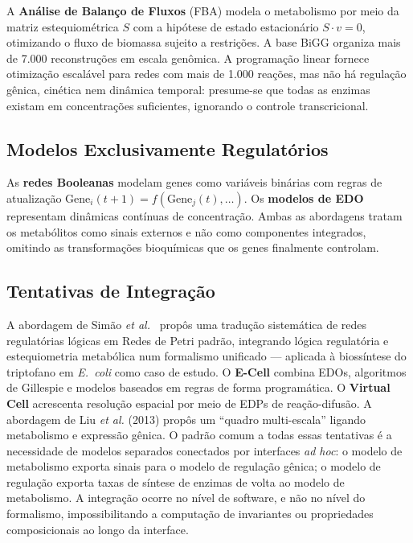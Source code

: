 A \textbf{Análise de Balanço de Fluxos} (FBA) modela o metabolismo por meio da
matriz estequiométrica $S$ com a hipótese de estado estacionário $S \cdot v = 0$,
otimizando o fluxo de biomassa sujeito a restrições. A base BiGG organiza mais
de 7.000 reconstruções em escala genômica. A programação linear fornece
otimização escalável para redes com mais de 1.000 reações, mas não há regulação
gênica, cinética nem dinâmica temporal: presume-se que todas as enzimas existam em
concentrações suficientes, ignorando o controle transcricional.

\subsection{Modelos Exclusivamente Regulatórios}
\label{subsec:apenas-reg}

As \textbf{redes Booleanas} modelam genes como variáveis binárias com regras de
atualização $\text{Gene}_i(t+1) = f(\text{Gene}_j(t), \ldots)$. Os \textbf{modelos de EDO} representam dinâmicas contínuas de concentração. Ambas as abordagens tratam os metabólitos como sinais externos e não como componentes integrados, omitindo as transformações bioquímicas que os genes finalmente controlam.

\subsection{Tentativas de Integração}
\label{subsec:tentativas-int}

A abordagem de Sim{\~a}o \emph{et al.}~\cite{Simao2005} propôs uma tradução
sistemática de redes regulatórias lógicas em Redes de Petri padrão,
integrando lógica regulatória e estequiometria metabólica num formalismo
unificado --- aplicada à biossíntese do triptofano em \textit{E.~coli}
como caso de estudo.
O \textbf{E-Cell} combina EDOs, algoritmos de Gillespie e modelos baseados em
regras de forma programática. O \textbf{Virtual Cell} acrescenta resolução
espacial por meio de EDPs de reação-difusão. A abordagem de Liu \emph{et al.}
(2013) propôs um ``quadro multi-escala'' ligando metabolismo e expressão gênica.
O padrão comum a todas essas tentativas é a necessidade de modelos separados
conectados por interfaces \textit{ad hoc}: o modelo de metabolismo exporta sinais
para o modelo de regulação gênica; o modelo de regulação exporta taxas de síntese
de enzimas de volta ao modelo de metabolismo. A integração ocorre no nível de
software, e não no nível do formalismo, impossibilitando a computação de
invariantes ou propriedades composicionais ao longo da interface.

